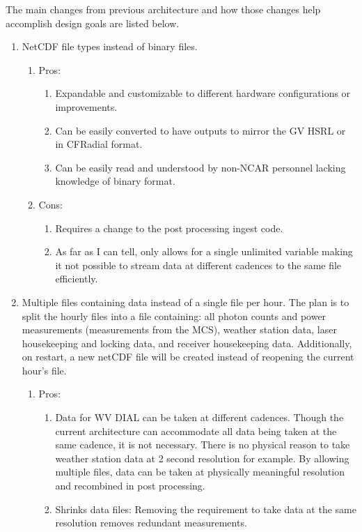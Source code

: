 The main changes from previous architecture and how those changes help accomplish design goals are listed below.
\begin{enumerate}
\item{NetCDF file types instead of binary files.}
	\begin{enumerate}
		\item{Pros:
			\begin{enumerate}
				\item{Expandable and customizable to different hardware configurations or improvements.}
				\item{Can be easily converted to have outputs to mirror the GV HSRL or in CFRadial format.}
				\item{Can be easily read and understood by non-NCAR personnel lacking knowledge of binary format.}
				\end{enumerate}
		}
		\item{Cons:
			\begin{enumerate}
				\item{Requires a change to the post processing ingest code.}
				\item{As far as I can tell, only allows for a single unlimited variable making it not possible to stream data at different cadences to the same file efficiently.}
				\end{enumerate}
		}
	\end{enumerate}
\item{Multiple files containing data instead of a single file per hour. The plan is to split the hourly files into a file containing: all photon counts and power measurements (measurements from the MCS), weather station data, laser housekeeping and locking data, and receiver housekeeping data. Additionally, on restart, a new netCDF file will be created instead of reopening the current hour's file.}
	\begin{enumerate}
		\item{Pros:
			\begin{enumerate}
				\item{Data for WV DIAL can be taken at different cadences. Though the current architecture can accommodate all data being taken at the same cadence, it is not necessary. There is no physical reason to take weather station data at 2 second resolution for example. By allowing multiple files, data can be taken at physically meaningful resolution and recombined in post processing.}
				\item{Shrinks data files: Removing the requirement to take data at the same resolution removes redundant measurements.}

\end{enumerate}}
\end{enumerate}
\end{enumerate}
